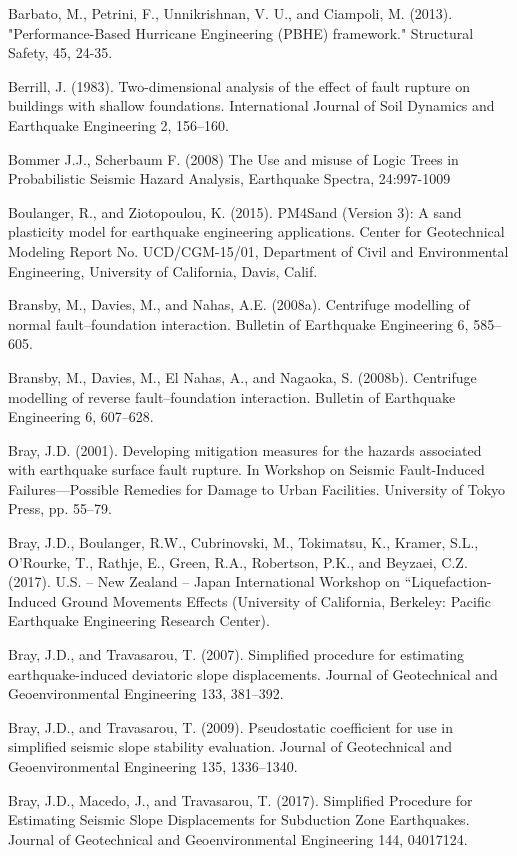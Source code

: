 Barbato, M., Petrini, F., Unnikrishnan, V. U., and Ciampoli, M. (2013). "Performance-Based Hurricane Engineering (PBHE) framework." Structural Safety, 45, 24-35.

Berrill, J. (1983). Two-dimensional analysis of the effect of fault rupture on buildings with shallow foundations. International Journal of Soil Dynamics and Earthquake Engineering 2, 156–160.

Bommer J.J., Scherbaum F. (2008) The Use and misuse of Logic Trees in Probabilistic Seismic Hazard Analysis, Earthquake Spectra, 24:997-1009

Boulanger, R., and Ziotopoulou, K. (2015). PM4Sand (Version 3): A sand plasticity model for earthquake engineering applications. Center for Geotechnical Modeling Report No. UCD/CGM-15/01, Department of Civil and Environmental Engineering, University of California, Davis, Calif.

Bransby, M., Davies, M., and Nahas, A.E. (2008a). Centrifuge modelling of normal fault–foundation interaction. Bulletin of Earthquake Engineering 6, 585–605.

Bransby, M., Davies, M., El Nahas, A., and Nagaoka, S. (2008b). Centrifuge modelling of reverse fault–foundation interaction. Bulletin of Earthquake Engineering 6, 607–628.

Bray, J.D. (2001). Developing mitigation measures for the hazards associated with earthquake surface fault rupture. In Workshop on Seismic Fault-Induced Failures—Possible Remedies for Damage to Urban Facilities. University of Tokyo Press, pp. 55–79.

Bray, J.D., Boulanger, R.W., Cubrinovski, M., Tokimatsu, K., Kramer, S.L., O’Rourke, T., Rathje, E., Green, R.A., Robertson, P.K., and Beyzaei, C.Z. (2017). U.S. – New Zealand – Japan International Workshop on “Liquefaction-Induced Ground Movements Effects (University of California, Berkeley: Pacific Earthquake Engineering Research Center).

Bray, J.D., and Travasarou, T. (2007). Simplified procedure for estimating earthquake-induced deviatoric slope displacements. Journal of Geotechnical and Geoenvironmental Engineering 133, 381–392.

Bray, J.D., and Travasarou, T. (2009). Pseudostatic coefficient for use in simplified seismic slope stability evaluation. Journal of Geotechnical and Geoenvironmental Engineering 135, 1336–1340.

Bray, J.D., Macedo, J., and Travasarou, T. (2017). Simplified Procedure for Estimating Seismic Slope Displacements for Subduction Zone Earthquakes. Journal of Geotechnical and Geoenvironmental Engineering 144, 04017124.

